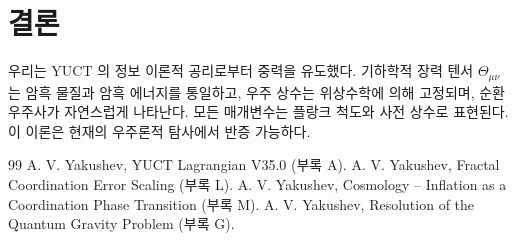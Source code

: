 \documentclass[12pt,a4paper]{article}
\begin{document}
	\section{결론}
	우리는 YUCT 의 정보 이론적 공리로부터 중력을 유도했다. 기하학적 장력 텐서 \(\Theta_{\mu\nu}\) 는 암흑 물질과 암흑 에너지를 통일하고, 우주 상수는 위상수학에 의해 고정되며, 순환 우주사가 자연스럽게 나타난다. 모든 매개변수는 플랑크 척도와 사전 상수로 표현된다. 이 이론은 현재의 우주론적 탐사에서 반증 가능하다.
	
	\begin{thebibliography}{99}
		 A. V. Yakushev, YUCT Lagrangian V35.0 (부록 A).
		 A. V. Yakushev, Fractal Coordination Error Scaling (부록 L).
		 A. V. Yakushev, Cosmology -- Inflation as a Coordination Phase Transition (부록 M).
		 A. V. Yakushev, Resolution of the Quantum Gravity Problem (부록 G).
	\end{thebibliography}
	
\end{document}
